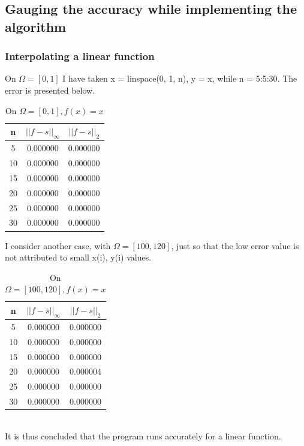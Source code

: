 \documentclass[12pt]{article}
\begin{document}
\subsection{Gauging the accuracy while implementing the algorithm}
\subsubsection{Interpolating a linear function}
On $\Omega = [0,1]$ I have taken {\selectfont x = linspace(0, 1, n), y = x}, while {\selectfont n = 5:5:30}. The error is presented below.
\begin{table}[h]
    \centering
    \begin{tabular}{|c|c|c|}
    \hline
        n & $||f-s||_\infty$ & $||f -s||_2$ \\
        \hline
        \hline
        5 & 0.000000 & 0.000000\\
        \hline
        10 & 0.000000 & 0.000000\\
        \hline
        15 & 0.000000 & 0.000000\\
        \hline
        20 & 0.000000 & 0.000000\\
        \hline
        25 & 0.000000 & 0.000000\\
        \hline
        30 & 0.000000 & 0.000000\\
        \hline
    \end{tabular}
    \caption{On $\Omega = [0,1], f(x) = x$}
\end{table}
I consider another case, with $\Omega = [100, 120]$, just so that the low error value is not attributed to small {\selectfont x(i), y(i)} values.
\begin{table}[h]
    \centering
    \begin{tabular}{|c|c|c|}
    \hline
        n & $||f-s||_\infty$ & $||f -s||_2$ \\
        \hline
        \hline
        5 & 0.000000 & 0.000000\\
        \hline
        10 & 0.000000 & 0.000000\\
        \hline
        15 & 0.000000 & 0.000000\\
        \hline
        20 & 0.000000 & 0.000004\\
        \hline
        25 & 0.000000 & 0.000000\\
        \hline
        30 & 0.000000 & 0.000000\\
        \hline
    \end{tabular}
    \caption{On $\Omega = [100,120], f(x) = x$}
\end{table}
\\It is thus concluded that the program runs accurately for a linear function.
\end{document}
